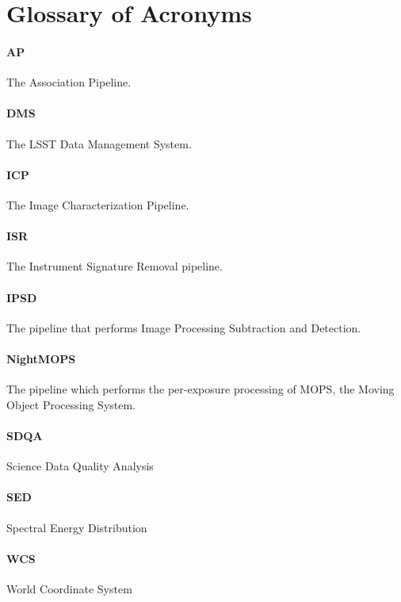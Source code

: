 \section{Glossary of Acronyms}

\paragraph{AP}
The Association Pipeline.

\paragraph{DMS}
The LSST Data Management System.

\paragraph{ICP}
The Image Characterization Pipeline.

\paragraph{ISR}
The Instrument Signature Removal pipeline.

\paragraph{IPSD}
The pipeline that performs Image Processing Subtraction and Detection.

\paragraph{NightMOPS}
The pipeline which performs the per-exposure processing of MOPS, the
Moving Object Processing System.

\paragraph{SDQA}
Science Data Quality Analysis

\paragraph{SED}
Spectral Energy Distribution

\paragraph{WCS}
World Coordinate System
